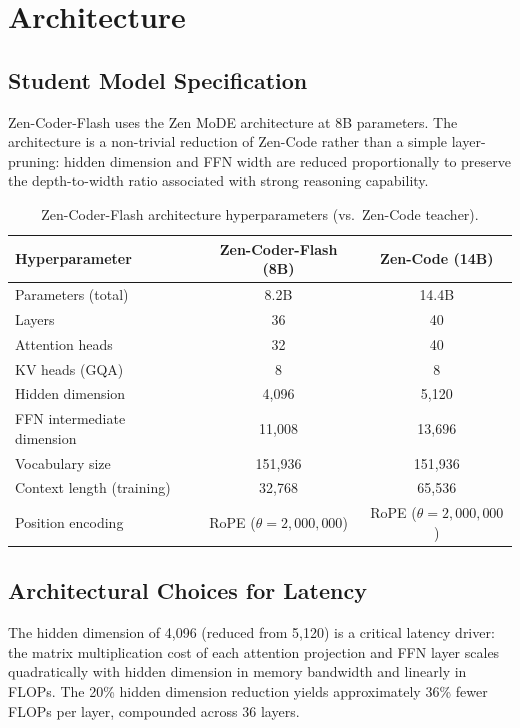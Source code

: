 \documentclass[11pt,a4paper]{article}
\begin{document}
\section{Architecture}

\subsection{Student Model Specification}

Zen-Coder-Flash uses the Zen MoDE architecture at 8B parameters. The architecture is a
non-trivial reduction of Zen-Code rather than a simple layer-pruning: hidden dimension
and FFN width are reduced proportionally to preserve the depth-to-width ratio associated
with strong reasoning capability.

\begin{table}[H]
\centering
\caption{Zen-Coder-Flash architecture hyperparameters (vs.\ Zen-Code teacher).}
\label{tab:arch}
\begin{tabular}{lcc}
\toprule
\textbf{Hyperparameter} & \textbf{Zen-Coder-Flash (8B)} & \textbf{Zen-Code (14B)} \\
\midrule
Parameters (total)           & 8.2B & 14.4B \\
Layers                       & 36 & 40 \\
Attention heads              & 32 & 40 \\
KV heads (GQA)               & 8  & 8 \\
Hidden dimension             & 4{,}096 & 5{,}120 \\
FFN intermediate dimension   & 11{,}008 & 13{,}696 \\
Vocabulary size              & 151{,}936 & 151{,}936 \\
Context length (training)    & 32{,}768 & 65{,}536 \\
Position encoding            & RoPE ($\theta = 2{,}000{,}000$) & RoPE ($\theta = 2{,}000{,}000$) \\
\bottomrule
\end{tabular}
\end{table}

\subsection{Architectural Choices for Latency}

The hidden dimension of 4,096 (reduced from 5,120) is a critical latency driver: the
matrix multiplication cost of each attention projection and FFN layer scales quadratically
with hidden dimension in memory bandwidth and linearly in FLOPs. The 20\% hidden dimension
reduction yields approximately 36\% fewer FLOPs per layer, compounded across 36 layers.
\end{document}
